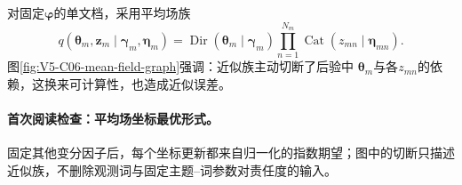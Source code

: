 \documentclass[UTF8,a4paper,11pt,openany]{ctexbook}
\begin{document}
\setcounter{page}{870}
\setcounter{chapter}{35}
\setcounter{section}{3}
\setcounter{figure}{5}
\pagestyle{headings}
对固定$\boldsymbol\varphi$的单文档，采用平均场族
\[
q(\boldsymbol\theta_m,\boldsymbol z_m\mid\boldsymbol\gamma_m,\boldsymbol\eta_m)
=\operatorname{Dir}(\boldsymbol\theta_m\mid\boldsymbol\gamma_m)
\prod_{n=1}^{N_m}\operatorname{Cat}(z_{mn}\mid\boldsymbol\eta_{mn}).
\]
图\ref{fig:V5-C06-mean-field-graph}强调：近似族主动切断了后验中
$\boldsymbol\theta_m$与各$z_{mn}$的依赖，这换来可计算性，也造成近似误差。

\FloatBarrier
\paragraph{首次阅读检查：平均场坐标最优形式。}
固定其他变分因子后，每个坐标更新都来自归一化的指数期望；图中的切断只描述近似族，不删除观测词与固定主题--词参数对责任度的输入。
\end{document}
